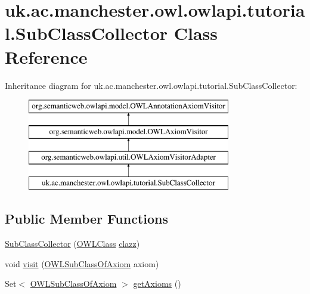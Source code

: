 \hypertarget{classuk_1_1ac_1_1manchester_1_1owl_1_1owlapi_1_1tutorial_1_1_sub_class_collector}{\section{uk.\-ac.\-manchester.\-owl.\-owlapi.\-tutorial.\-Sub\-Class\-Collector Class Reference}
\label{classuk_1_1ac_1_1manchester_1_1owl_1_1owlapi_1_1tutorial_1_1_sub_class_collector}
}
Inheritance diagram for uk.\-ac.\-manchester.\-owl.\-owlapi.\-tutorial.\-Sub\-Class\-Collector\-:\begin{figure}[H]
\begin{center}
\leavevmode
\includegraphics[height=4.000000cm]{classuk_1_1ac_1_1manchester_1_1owl_1_1owlapi_1_1tutorial_1_1_sub_class_collector}
\end{center}
\end{figure}
\subsection*{Public Member Functions}
\begin{DoxyCompactItemize}
\item 
\hyperlink{classuk_1_1ac_1_1manchester_1_1owl_1_1owlapi_1_1tutorial_1_1_sub_class_collector_a8d8ab224832c37b18dab3e6a872f2fd0}{Sub\-Class\-Collector} (\hyperlink{interfaceorg_1_1semanticweb_1_1owlapi_1_1model_1_1_o_w_l_class}{O\-W\-L\-Class} \hyperlink{classuk_1_1ac_1_1manchester_1_1owl_1_1owlapi_1_1tutorial_1_1_sub_class_collector_a8252997828e01c6f360356998e373061}{clazz})
\item 
void \hyperlink{classuk_1_1ac_1_1manchester_1_1owl_1_1owlapi_1_1tutorial_1_1_sub_class_collector_a763ad5dd1e9b137699d0a90779b665b7}{visit} (\hyperlink{interfaceorg_1_1semanticweb_1_1owlapi_1_1model_1_1_o_w_l_sub_class_of_axiom}{O\-W\-L\-Sub\-Class\-Of\-Axiom} axiom)
\item 
Set$<$ \hyperlink{interfaceorg_1_1semanticweb_1_1owlapi_1_1model_1_1_o_w_l_sub_class_of_axiom}{O\-W\-L\-Sub\-Class\-Of\-Axiom} $>$ \hyperlink{classuk_1_1ac_1_1manchester_1_1owl_1_1owlapi_1_1tutorial_1_1_sub_class_collector_a3be86cd6f9dcc013c550cadcf95a77a4}{get\-Axioms} ()
\end{DoxyCompactItemize}
